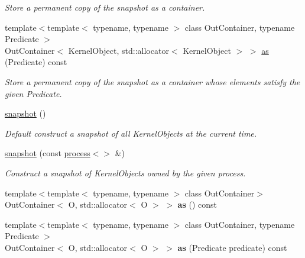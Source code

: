 \begin{DoxyCompactItemize}
\begin{DoxyCompactList}\small\item\em Store a permanent copy of the snapshot as a container. \end{DoxyCompactList}\item 
{\footnotesize template$<$template$<$ typename, typename $>$ class Out\+Container, typename Predicate $>$ }\\Out\+Container$<$ Kernel\+Object, std\+::allocator$<$ Kernel\+Object $>$ $>$ \mbox{\hyperlink{classdistant_1_1kernel__objects_1_1snapshot_a6e9d7ef5c4273d1dde5fee1055a63b7a}{as}} (Predicate) const
\begin{DoxyCompactList}\small\item\em Store a permanent copy of the snapshot as a container whose elements satisfy the given {\itshape Predicate}. \end{DoxyCompactList}\item 
\mbox{\label{classdistant_1_1kernel__objects_1_1snapshot_ac5988aabacb149278b666a9903bbe9c7}} 
\mbox{\hyperlink{classdistant_1_1kernel__objects_1_1snapshot_ac5988aabacb149278b666a9903bbe9c7}{snapshot}} ()
\begin{DoxyCompactList}\small\item\em Default construct a snapshot of all {\itshape Kernel\+Objects} at the current time. \end{DoxyCompactList}\item 
\mbox{\label{classdistant_1_1kernel__objects_1_1snapshot_a35c6b486633d03b207ab536771e86b16}} 
\mbox{\hyperlink{classdistant_1_1kernel__objects_1_1snapshot_a35c6b486633d03b207ab536771e86b16}{snapshot}} (const \mbox{\hyperlink{classdistant_1_1kernel__objects_1_1process}{process}}$<$$>$ \&)
\begin{DoxyCompactList}\small\item\em Construct a snapshot of {\itshape Kernel\+Objects} owned by the given process. \end{DoxyCompactList}\item 
\mbox{\label{classdistant_1_1kernel__objects_1_1snapshot_a1a6f5f5e41cb82810a675b5d0b607ba2}} 
{\footnotesize template$<$template$<$ typename, typename $>$ class Out\+Container$>$ }\\Out\+Container$<$ O, std\+::allocator$<$ O $>$ $>$ {\bfseries as} () const
\item 
\mbox{\label{classdistant_1_1kernel__objects_1_1snapshot_aa47a96259e30ef7fd2c495b2d75c18af}} 
{\footnotesize template$<$template$<$ typename, typename $>$ class Out\+Container, typename Predicate $>$ }\\Out\+Container$<$ O, std\+::allocator$<$ O $>$ $>$ {\bfseries as} (Predicate predicate) const
\end{DoxyCompactItemize}
